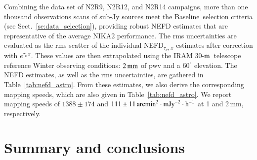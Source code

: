 \documentclass[traditionalabstract]{aa}
\newcommand{\trentemetre}{30-$\rm{m}$}
\newcommand{\baseline}{Baseline}%
\newcommand{\taunu}{\tau_{\nu}}
\begin{document}
{Combining the data set of N2R9, N2R12, and N2R14 campaigns, more than one
thousand observations scans of sub-Jy sources meet the \baseline\ selection
criteria (see Sect.~\ref{se:data_selection}), providing robust NEFD estimates
that are representative of the average NIKA2 performance. The rms
uncertainties are evaluated as the rms scatter of the individual
NEFD$_{\taunu,\, x}$ estimates after correction with
$e^{\taunu\,x}$. 
These values are then extrapolated using the IRAM
\trentemetre\ telescope reference Winter observing conditions: $2\,\rm{mm}$ of
 pwv and a $60^{\circ}$ elevation. The NEFD
estimates, as well as the rms uncertainties, are gathered in
Table~\ref{tab:nefd_astro}.
From these estimates, we also derive the corresponding mapping speeds,
which are also given in Table~\ref{tab:nefd_astro}.
We report mapping speeds of $1388 \pm 174$ and
$111 \pm 11 \, \rm{arcmin}^2\cdot \rm{mJy}^{-2}\cdot \rm{h}^{-1}$ at 1
and 2\,mm, respectively. 




\section{Summary and conclusions}
\label{se:summary}

}
\end{document}
